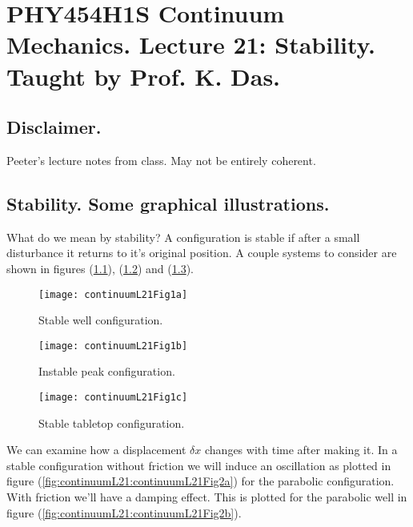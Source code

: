 
%

\chapter{PHY454H1S Continuum Mechanics.  Lecture 21: Stability.  Taught by Prof. K. Das.}
\label{chap:continuumL21}
{}
\date{Mar 29, 2012}

\beginArtWithToc

\section{Disclaimer.}

Peeter's lecture notes from class.  May not be entirely coherent.

\section{Stability.  Some graphical illustrations.}

What do we mean by stability?  A configuration is stable if after a small disturbance it returns to it's original position.  A couple systems to consider are shown in figures (\ref{fig:continuumL21:continuumL21Fig1a}), (\ref{fig:continuumL21:continuumL21Fig1b}) and (\ref{fig:continuumL21:continuumL21Fig1c}).

\begin{figure}[htp]
   \centering
   \texttt{[image: continuumL21Fig1a]}
   \caption{Stable well configuration.}\label{fig:continuumL21:continuumL21Fig1a}
\end{figure}
\begin{figure}[htp]
   \centering
   \texttt{[image: continuumL21Fig1b]}
   \caption{Instable peak configuration.}\label{fig:continuumL21:continuumL21Fig1b}
\end{figure}
\begin{figure}[htp]
   \centering
   \texttt{[image: continuumL21Fig1c]}
   \caption{Stable tabletop configuration.}\label{fig:continuumL21:continuumL21Fig1c}
\end{figure}

We can examine how a displacement $\delta x$ changes with time after making it.  In a stable configuration without friction we will induce an oscillation as plotted in figure (\ref{fig:continuumL21:continuumL21Fig2a}) for the parabolic configuration.  With friction we'll have a damping effect.  This is plotted for the parabolic well in figure (\ref{fig:continuumL21:continuumL21Fig2b}).


